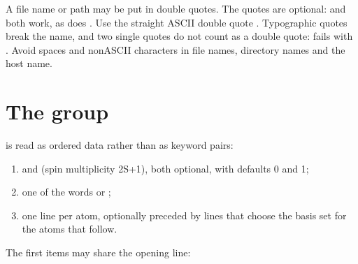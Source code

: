 \documentclass[letterpaper,10pt,english,openany,oneside]{sphinxmanual}
\begin{document}
\begin{description}
\sphinxAtStartPar
A file name or path may be put in double quotes. The quotes are optional:  and 
both work, as does . Use the straight ASCII double quote . Typographic quotes
break the name, and two single quotes do not count as a double quote:  fails with
. Avoid spaces and non\sphinxhyphen{}ASCII characters in file names, directory names and the
host name.



\end{description}


\section{The  group}
\label{\detokenize{start/input-syntax:the-molecule-group}}
\sphinxAtStartPar
{\hyperref[\detokenize{reference/molecule:group-molecule}]{}} is read as ordered data rather than as keyword pairs:
\begin{enumerate}
%
\item {} 
\sphinxAtStartPar
{} and  (spin multiplicity 2S+1), both optional, with defaults 0 and 1;

\item {} 
\sphinxAtStartPar
one of the words  or ;

\item {} 
\sphinxAtStartPar
one line per atom, optionally preceded by  lines that choose the basis set for the atoms that follow.

\end{enumerate}

\sphinxAtStartPar
The first items may share the opening line:
\end{document}
